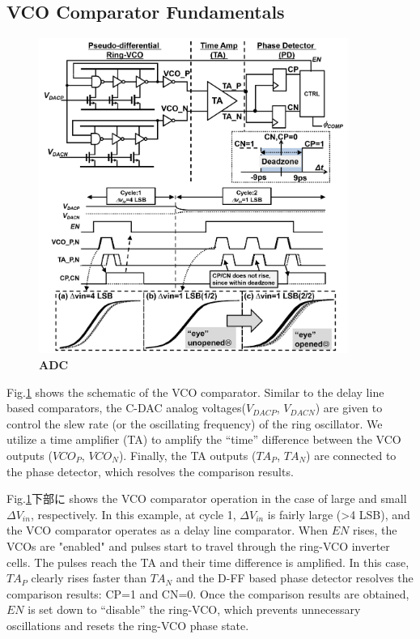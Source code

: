 \documentclass[letterpaper, 10 pt, conference]{ieeeconf}  %
\begin{document}
\subsection{VCO Comparator Fundamentals}
\begin{figure}[ht!]
\centering
 \includegraphics[width=0.9\textwidth]{figs/full.png}
  \captionsetup{font=footnotesize}
  \caption{\textbf{ADC}}
  \label{schema}
\end{figure}

Fig.\ref{schema} shows the schematic of the VCO comparator. Similar to the delay line based comparators\cite{agnes20089}, the C-DAC analog voltages($V_{DACP}$, $V_{DACN}$) are given to control the slew rate (or the oscillating frequency) of the ring oscillator. We utilize a time amplifier (TA)\cite{lee20089} to amplify the “time” difference between the VCO outputs ($VCO_P$, $VCO_N$). Finally, the TA outputs ($TA_P$, $TA_N$) are connected to the phase detector, which resolves the comparison results.

Fig.\ref{schema}下部に shows the VCO comparator operation in the case of large and small $\Delta V_{in}$, respectively. In this example, at cycle 1, $\Delta V_{in}$ is fairly large (>4 LSB), and the VCO comparator operates as a delay line comparator. When $EN$ rises, the VCOs are "enabled" and pulses start to travel through the ring-VCO inverter cells. The pulses reach the TA and their time difference is amplified. In this case, $TA_P$ clearly rises faster than $TA_N$ and the D-FF based phase detector resolves the comparison results: CP=1 and CN=0. Once the comparison results are obtained, $EN$ is set down to “disable” the ring-VCO, which prevents unnecessary oscillations and resets the ring-VCO phase state.
\end{document}
